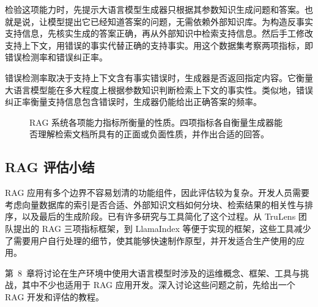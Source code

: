 
\begin{practicaltip}
检验这项能力时，先提示大语言模型生成器只根据其参数知识生成问题和答案。也就是说，让模型提出它已经知道答案的问题，无需依赖外部知识库。为构造反事实支持信息，先核实生成的答案正确，再从外部知识中检索支持信息。然后手工修改支持上下文，用错误的事实代替正确的支持事实。用这个数据集考察两项指标，即错误检测率和错误纠正率。

错误检测率取决于支持上下文含有事实错误时，生成器是否返回指定内容。它衡量大语言模型能在多大程度上根据参数知识判断检索上下文的事实性。类似地，错误纠正率衡量支持信息包含错误时，生成器仍能给出正确答案的频率。
\end{practicaltip}

\begin{figure}[!htbp]
\centering

\caption{RAG 系统各项能力指标所衡量的性质。四项指标各自衡量生成器能否理解检索文档所具有的正面或负面性质，并作出合适的回答。}
\label{fig:ch07-capabilities}
\end{figure}

\subsection{RAG 评估小结}
RAG 应用有多个边界不容易划清的功能组件，因此评估较为复杂。开发人员需要考虑向量数据库的索引是否合适、外部知识文档如何分块、检索结果的相关性与排序，以及最后的生成阶段。已有许多研究与工具简化了这个过程。从 TruLens 团队提出的 RAG 三项指标框架，到 LlamaIndex 等便于实现的框架，这些工具减少了需要用户自行处理的细节，使其能够快速制作原型，并开发适合生产使用的应用。

第~8~章将讨论在生产环境中使用大语言模型时涉及的运维概念、框架、工具与挑战，其中不少也适用于 RAG 应用开发。深入讨论这些问题之前，先给出一个 RAG 开发和评估的教程。
